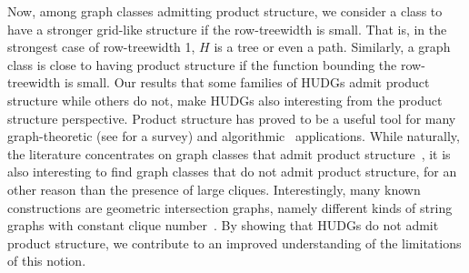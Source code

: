Now, among graph classes admitting product structure, we consider a class to have a stronger grid-like structure if the row-treewidth is small.
That is, in the strongest case of row-treewidth 1, $ H $ is a tree or even a path.
Similarly, a graph class is close to having product structure if the function bounding the row-treewidth is small.
%
Our results that some families of HUDGs admit product structure while others do not, 
make HUDGs also interesting from the product structure perspective.
Product structure has proved to be a useful tool for many graph-theoretic (see \cite{hickingbotham_shallow_2024} for a survey) and algorithmic~\cite{an_PS_algo_application_2025,bose_optimal_2022} applications.
While naturally, the literature concentrates on graph classes that admit product structure~\cite{dujmovic_planar_2019,campbell_product_2022,hickingbotham_shallow_2024,hickingbotham_product_2024,distel_improved_2022,dujmovic_graph_2023}, it is also interesting to find graph classes that do not admit product structure, for an other reason than the presence of large cliques.
Interestingly, many known constructions are geometric intersection graphs, namely different kinds of string graphs with constant clique number~\cite{merker_intersection_2024,karol_string_product_structure_2025}.
By showing that HUDGs do not admit product structure, we contribute to an improved understanding of the limitations of this notion.
%
%
